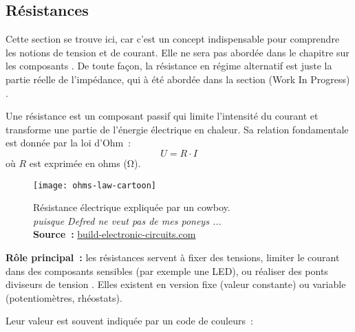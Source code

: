 \subsection{R\'esistances} \label{subsec:resistors}
\begin{Note}
	Cette section se trouve ici, car c'est un concept indispensable pour comprendre les notions de tension et de courant. Elle ne sera pas abord\'ee dans le chapitre sur les composants .
	De toute fa\c{c}on, la r\'esistance en r\'egime alternatif est juste la partie r\'eelle de l'imp\'edance, qui \`a \'et\'e abord\'ee dans la section (Work In Progress) .
\end{Note}
Une r\'esistance est un composant passif qui limite l'intensit\'e du courant et transforme une partie de l'\'energie \'electrique en chaleur. Sa relation fondamentale est donn\'ee par la loi d'Ohm~:
\[
U = R \cdot I
\]
où \(R\) est exprim\'ee en ohms (\unit{\ohm}).
\begin{figure}[H]
    \centering
    \texttt{[image: ohms-law-cartoon]}
    \caption{
        \centering
        R\'esistance \'electrique expliqu\'ee par un cowboy. \\\emph{puisque Defred ne veut pas de mes poneys ...}\\
        \textbf{Source~:}
        \href{https://build-electronic-circuits.com/ohms-law}{build-electronic-circuits.com}
    }
\end{figure}
\textbf{Rôle principal~:} les r\'esistances servent à fixer des tensions, limiter le courant dans des composants sensibles (par exemple une LED), ou r\'ealiser des ponts diviseurs de tension . Elles existent en version fixe (valeur constante) ou variable (potentiom\`etres, rh\'eostats).\par
Leur valeur est souvent indiqu\'ee par un code de couleurs~:
